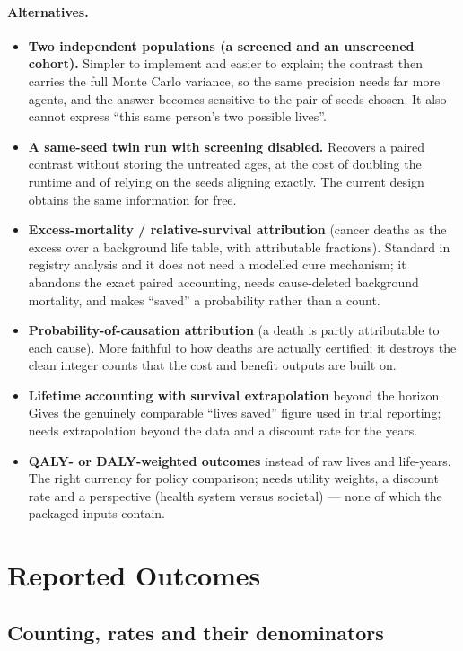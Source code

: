 \documentclass[12pt,a4paper]{article}
\newcommand{\alt}[1]{\paragraph{Alternatives.} #1}
\begin{document}
\alt{\begin{itemize}[nosep]
  \item \textbf{Two independent populations (a screened and an unscreened cohort).} Simpler to implement and
        easier to explain; the contrast then carries the full Monte Carlo variance, so the same precision
        needs far more agents, and the answer becomes sensitive to the pair of seeds chosen. It also cannot
        express ``this same person's two possible lives''.
  \item \textbf{A same-seed twin run with screening disabled.} Recovers a paired contrast without storing
        the untreated ages, at the cost of doubling the runtime and of relying on the seeds aligning
        exactly. The current design obtains the same information for free.
  \item \textbf{Excess-mortality / relative-survival attribution} (cancer deaths as the excess over a
        background life table, with attributable fractions). Standard in registry analysis and it does not
        need a modelled cure mechanism; it abandons the exact paired accounting, needs cause-deleted
        background mortality, and makes ``saved'' a probability rather than a count.
  \item \textbf{Probability-of-causation attribution} (a death is partly attributable to each cause).
        More faithful to how deaths are actually certified; it destroys the clean integer counts that the
        cost and benefit outputs are built on.
  \item \textbf{Lifetime accounting with survival extrapolation} beyond the horizon. Gives the genuinely
        comparable ``lives saved'' figure used in trial reporting; needs extrapolation beyond the data and
        a discount rate for the years.
  \item \textbf{QALY- or DALY-weighted outcomes} instead of raw lives and life-years. The right currency for
        policy comparison; needs utility weights, a discount rate and a perspective (health system versus
        societal) --- none of which the packaged inputs contain.
\end{itemize}}

\section{Reported Outcomes}

\subsection{Counting, rates and their denominators}
\end{document}
